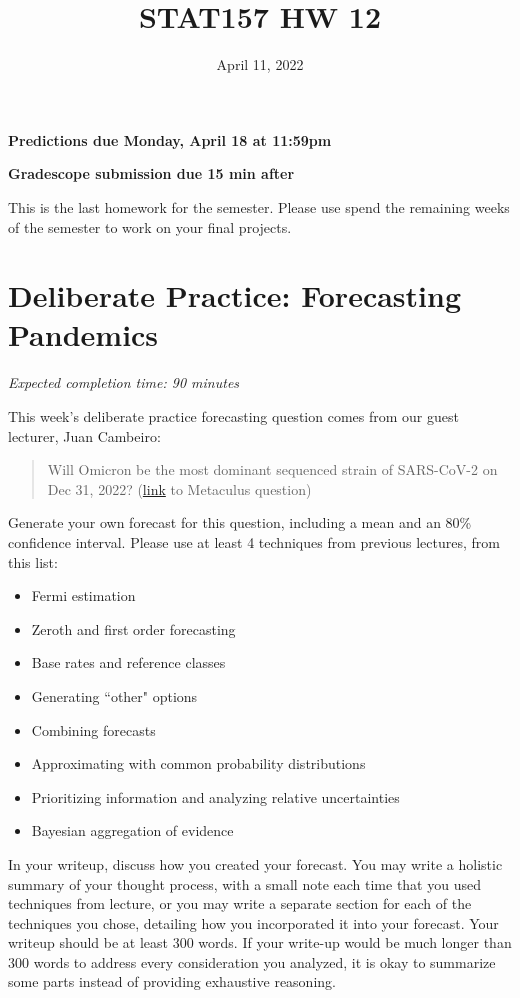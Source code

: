 \documentclass[11pt]{article}
\title{STAT157 HW 12}
\date{April 11, 2022}
\begin{document}
\maketitle

\hfill \textbf{Predictions due Monday, April 18 at 11:59pm}

\hfill \textbf{Gradescope submission due 15 min after}

This is the last homework for the semester. Please use spend the remaining weeks of the semester to work on your final projects.

\section*{Deliberate Practice: Forecasting Pandemics}

\emph{Expected completion time: 90 minutes}

This week's deliberate practice forecasting question comes from our guest lecturer, Juan Cambeiro:
\begin{quote}
	Will Omicron be the most dominant sequenced strain of SARS-CoV-2 on Dec 31, 2022? (\href{https://www.metaculus.com/questions/8880/omicron-dominant-variant-dec-31-2022/}{link} to Metaculus question)
\end{quote}

Generate your own forecast for this question, including a mean and an 80\% confidence interval. Please use at least 4 techniques from previous lectures, from this list:
\begin{itemize}
	\item Fermi estimation
	\item Zeroth and first order forecasting
	\item Base rates and reference classes
	\item Generating ``other" options
	\item Combining forecasts
	\item Approximating with common probability distributions
	\item Prioritizing information and analyzing relative uncertainties
	\item Bayesian aggregation of evidence
\end{itemize}

In your writeup, discuss how you created your forecast. You may write a holistic summary of your thought process, with a small note each time that you used techniques from lecture, or you may write a separate section for each of the techniques you chose, detailing how you incorporated it into your forecast. Your writeup should be at least 300 words. If your write-up would be much longer than 300 words to address every consideration you analyzed, it is okay to summarize some parts instead of providing exhaustive reasoning.
\end{document}
